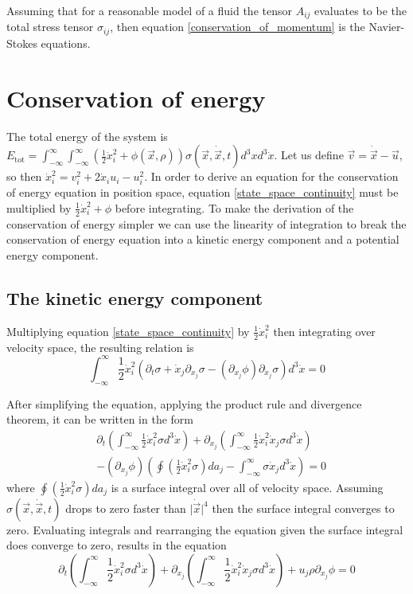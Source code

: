 \documentclass[%
 reprint,
 amsmath,amssymb,
 aps,
]{revtex4-1}
\newcommand{\dvec}[1]{\dot{\vec{#1}}}
\newcommand{\intVdot}[1]{\int_{-\infty}^{\infty} #1 d^3\dot{x}}
\newcommand{\intVVdot}[1]{\int_{-\infty}^{\infty}\int_{-\infty}^{\infty} #1 d^3xd^3\dot{x}}
\begin{document}
Assuming that for a reasonable model of a fluid the tensor $A_{ij}$ evaluates to be the total stress tensor $\sigma_{ij}$, then equation \eqref{conservation_of_momentum} is the Navier-Stokes equations.

\pagebreak %

\section{Conservation of energy}
The total energy of the system is $E_{\text{tot}}=\intVVdot{\left(\frac{1}{2}\dot{x}_i^2 + \phi(\vec{x}, \rho)\right)\sigma(\vec{x}, \dvec{x}, t)}$. Let us define $\vec{v} = \dvec{x} - \vec{u}$, so then $\dot{x}_i^2 = v_i^2 + 2\dot{x}_i u_i - u_i^2$. In order to derive an equation for the conservation of energy equation in position space, equation \eqref{state_space_continuity} must be multiplied by $\frac{1}{2}\dot{x}_i^2 + \phi$ before integrating. To make the derivation of the conservation of energy simpler we can use the linearity of integration to break the conservation of energy equation into a kinetic energy component and a potential energy component.

\subsection{The kinetic energy component}
Multiplying equation \eqref{state_space_continuity} by $\frac{1}{2}\dot{x}_i^2$ then integrating over velocity space, the resulting relation is
\[
\intVdot{\frac{1}{2}\dot{x}_i^2\left(\partial_t \sigma + \dot{x}_j\partial_{x_j}\sigma-\left(\partial_{x_j}\phi\right)\partial_{\dot{x}_j}\sigma\right)}=0
\]

After simplifying the equation, applying the product rule and divergence theorem, it can be written in the form
\[
\begin{split}
& \partial_t\left(\intVdot{\frac{1}{2}\dot{x}_i^2\sigma}\right) + \partial_{x_j}\left(\intVdot{\frac{1}{2}\dot{x}_i^2\dot{x}_j\sigma}\right) \\ & -  \left(\partial_{x_j}\phi\right)\left(\oint\left(\frac{1}{2}\dot{x}_i^2\sigma\right)da_j - \intVdot{\sigma\dot{x}_j}\right)=0
\end{split}
\]
where $\oint\left(\frac{1}{2}\dot{x}_i^2\sigma\right)da_j$ is a surface integral over all of velocity space. Assuming $\sigma(\vec{x}, \dvec{x}, t)$ drops to zero faster than $\lvert\dvec{x}\rvert^4$ then the surface integral converges to zero. Evaluating integrals and rearranging the equation given the surface integral does converge to zero, results in the equation
\[
\partial_t\left(\intVdot{\frac{1}{2}\dot{x}_i^2\sigma}\right) + \partial_{x_j}\left(\intVdot{\frac{1}{2}\dot{x}_i^2\dot{x}_j\sigma}\right) + u_j\rho\partial_{x_j}\phi=0
\]
\end{document}
